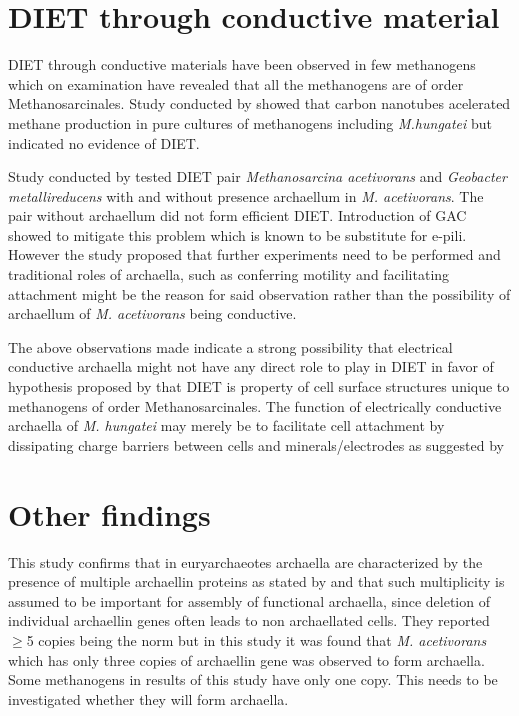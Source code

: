 \documentclass[fontsize=12pt,headsepline=true, bibliography=totocnumbered, twoside]{scrbook} %
\begin{document}
\section{DIET through conductive material}

DIET through conductive materials have been observed in few methanogens\citep{lovley2017syntrophy} which on examination have revealed that all the methanogens are of order Methanosarcinales. Study conducted by \citet{salvador2017carbon} showed that carbon nanotubes acelerated methane production in pure cultures of methanogens including \textit{M.hungatei} but indicated no evidence of DIET.

Study conducted by \citet{holmes2021mechanisms} tested DIET pair \textit{Methanosarcina acetivorans} and \textit{Geobacter metallireducens} with and without presence archaellum in \textit{M. acetivorans}. The pair without archaellum did not form efficient DIET. Introduction of GAC showed to mitigate this problem which is known to be substitute for e-pili\citep{lovley2017syntrophy}. However the study proposed that further experiments need to be performed and traditional roles of archaella, such as conferring motility and facilitating attachment might be the reason for said observation rather than the possibility of archaellum of \textit{M. acetivorans} being conductive.


\vspace{1cm}

The above observations made indicate a strong possibility that electrical conductive archaella might not have any direct role to play in DIET in favor of hypothesis proposed by \citet{yee2020extracellular} that DIET is property of cell surface structures unique to methanogens of order Methanosarcinales. The function of electrically conductive archaella of \textit{M. hungatei} may merely be to facilitate cell attachment by dissipating charge barriers between cells and minerals/electrodes as suggested by \citet{walker2019archaellum}


\section{Other findings}

This study confirms that in euryarchaeotes archaella are characterized by the presence of multiple archaellin proteins as stated by \citet{meshcheryakov2019high} and that such multiplicity is assumed to be important for assembly of functional archaella, since deletion of individual archaellin genes often leads to non archaellated cells. They reported $\geq$5 copies being the norm but in this study it was found that \textit{M. acetivorans} which has only three copies of archaellin gene was observed to form archaella\citep{holmes2021mechanisms}. Some methanogens in results of this study have only one copy. This needs to be investigated whether they will form archaella.
\end{document}
